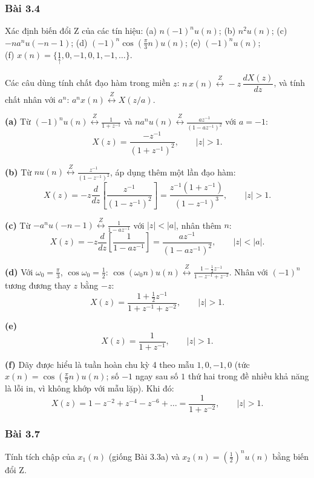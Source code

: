 \documentclass[12pt,a4paper]{article}
\newcommand{\org}[1]{\underset{\uparrow}{#1}}
\newcommand{\zpair}{\overset{Z}{\longleftrightarrow}}
\begin{document}
\subsubsection*{Bài 3.4}
\begin{mdframed}[style=exbox]
Xác định biến đổi Z của các tín hiệu:
(a) $n(-1)^n u(n)$; (b) $n^2 u(n)$; (c) $-n a^n u(-n-1)$; (d) $(-1)^n \cos\left(\frac{\pi}{3}n\right) u(n)$; (e) $(-1)^n u(n)$; \\
(f) $x(n) = \{\org{1}, 0, -1, 0, 1, -1, \dots\}$.
\end{mdframed}

Các câu dùng tính chất đạo hàm trong miền $z$: $n\,x(n) \zpair -z\,\dfrac{dX(z)}{dz}$, và tính chất nhân với $a^n$: $a^n x(n) \zpair X(z/a)$.

\textbf{(a)} Từ $(-1)^n u(n) \zpair \frac{1}{1 + z^{-1}}$ và $n a^n u(n) \zpair \frac{a z^{-1}}{(1 - a z^{-1})^2}$ với $a = -1$:
\[
    X(z) = \frac{-z^{-1}}{(1 + z^{-1})^2}, \qquad |z| > 1.
\]

\textbf{(b)} Từ $n u(n) \zpair \frac{z^{-1}}{(1 - z^{-1})^2}$, áp dụng thêm một lần đạo hàm:
\[
    X(z) = -z \frac{d}{dz}\left[\frac{z^{-1}}{(1 - z^{-1})^2}\right] = \frac{z^{-1}(1 + z^{-1})}{(1 - z^{-1})^3}, \qquad |z| > 1.
\]

\textbf{(c)} Từ $-a^n u(-n-1) \zpair \frac{1}{1 - a z^{-1}}$ với $|z| < |a|$, nhân thêm $n$:
\[
    X(z) = -z \frac{d}{dz}\left[\frac{1}{1 - a z^{-1}}\right] = \frac{a z^{-1}}{(1 - a z^{-1})^2}, \qquad |z| < |a|.
\]

\textbf{(d)} Với $\omega_0 = \frac{\pi}{3}$, $\cos\omega_0 = \frac{1}{2}$: $\cos(\omega_0 n) u(n) \zpair \frac{1 - \frac{1}{2}z^{-1}}{1 - z^{-1} + z^{-2}}$. Nhân với $(-1)^n$ tương đương thay $z$ bằng $-z$:
\[
    X(z) = \frac{1 + \frac{1}{2}z^{-1}}{1 + z^{-1} + z^{-2}}, \qquad |z| > 1.
\]

\textbf{(e)}
\[
    X(z) = \frac{1}{1 + z^{-1}}, \qquad |z| > 1.
\]

\textbf{(f)} Dãy được hiểu là tuần hoàn chu kỳ 4 theo mẫu $1, 0, -1, 0$ (tức $x(n) = \cos\left(\frac{\pi}{2}n\right)u(n)$; số $-1$ ngay sau số $1$ thứ hai trong đề nhiều khả năng là lỗi in, vì không khớp với mẫu lặp). Khi đó:
\[
    X(z) = 1 - z^{-2} + z^{-4} - z^{-6} + \dots = \frac{1}{1 + z^{-2}}, \qquad |z| > 1.
\]

\subsubsection*{Bài 3.7}
\begin{mdframed}[style=exbox]
Tính tích chập của $x_1(n)$ (giống Bài 3.3a) và $x_2(n) = \left(\frac{1}{2}\right)^n u(n)$ bằng biến đổi Z.
\end{mdframed}
\end{document}
